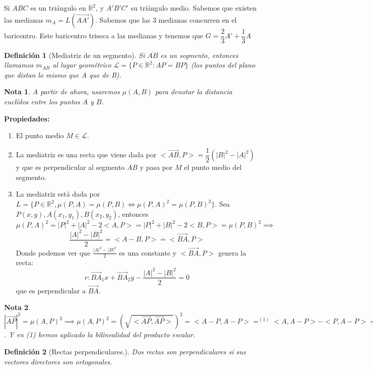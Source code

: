 \documentclass[11pt, a4paper, titlepage]{article}
\makeatletter
\renewenvironment{proof}[1][\proofname] {\vspace{-15pt}\par\pushQED{\qed}\normalfont\topsep6\p@\@plus6\p@\relax\trivlist\item[\hskip\labelsep\it#1\@addpunct{.}]\ignorespaces}{\popQED\endtrivlist\@endpefalse}
\newcommand{\R}{\mathbb{R}}
\renewcommand{\vec}{\overrightarrow}
\renewenvironment{proof}[1][\proofname] {\par\pushQED{\qed}\normalfont\topsep6\p@\@plus6\p@\relax\trivlist\item[\hskip\labelsep\itshape\sffamily#1\@addpunct{.}]\ignorespaces}{\popQED\endtrivlist\@endpefalse}
\theoremstyle{theorem-style}
\theoremstyle{definition-style}
\newtheorem{ndef}{Definición}[section]
\theoremstyle{remark-style}
\newtheorem*{nota}{Nota}
\theoremstyle{example-style}
\newenvironment{nlist}
{\begin{enumerate}
    \renewcommand\labelenumi{(\emph{\roman{enumi})}}}
  {\end{enumerate}}
\makeatother
\begin{document}
Si $ABC$ es un triángulo en $\R^2$, y $A'B'C'$ su triángulo medio. Sabemos que existen las medianas $m_A = L(\vec{AA'})$. Sabemos que las 3 medianas concurren en el baricentro. Este baricentro triseca a las medianas y tenemos que $G = \dfrac{2}{3}A' + \dfrac{1}{3}A$

\begin{ndef}[Mediatriz de un segmento]
  Si $\overline{AB}$ es un segmento, entonces llamamos $m_{AB}$  al lugar geométrico $\mathcal{L}=\{P \in \R^2 : AP = BP\}$ (los puntos del plano que distan lo mismo que A que de B).
\end{ndef}

\begin{center}
\end{center}

\begin{nota}
  A partir de ahora, usaremos $\mu(A,B)$ para denotar la distancia euclídea entre los puntos $A$ y $B$.
\end{nota}

\textbf{Propiedades:}
\begin{nlist}
\item El punto medio $M \in \mathcal{L}$. 
\item La mediatriz es una recta que viene dada por $<\vec{AB},P> = \dfrac{1}{2}(|B|^2-|A|^2)$ y que es perpendicular al segmento $AB$ y pasa por $M$ el punto medio del segmento.\\
  \begin{proof}
    La mediatriz está dada por $L = \{P\in\mathbb{R}^2, \mu(P,A) = \mu(P,B)\iff \mu(P,A)^2 = \mu(P,B)^2\}$. Sea $P(x,y),A(x_1,y_1),B(x_2,y_2)$, entonces $\mu(P,A)^2 = |P|^2+|A|^2-2<A,P> = |P|^2+|B|^2-2<B,P>= \mu(P,B)^2 \implies$ $$ \frac{|A|^2-|B|^2}{2} =<A-B,P> = <\vec{BA},P>$$
    Donde podemos ver que $\frac{|A|^2-|B|^2}{2}$ es una constante y $<\vec{BA},P>$ genera la recta:
    \[
      r: \vec{BA}_1x+ \vec{BA}_2y - \frac{|A|^2-|B|^2}{2} = 0
    \]
    que es perpendicular a $\vec{BA}$.
  \end{proof}
\end{nlist}
\begin{nota}
  $|\vec{AP}|^2 = \mu(A,P)^2\implies \mu(A,P)^2 = 	\left(\sqrt{<\vec{AP},\vec{AP}>}\right)^2 =  < A-P, A-P>  =^{(1)} <A,A-P>-<P,A-P> = <A,A> -<A,P>+<P,P>-<P,A>  = |A|^2+|P|^2-2<P,A>$. Y en (1) hemos aplicado la bilinealidad del producto escalar.
\end{nota}
\begin{ndef}[Rectas perpendiculares.]
  Dos rectas son perpendiculares si sus vectores directores son ortogonales.
\end{ndef}
\end{document}
